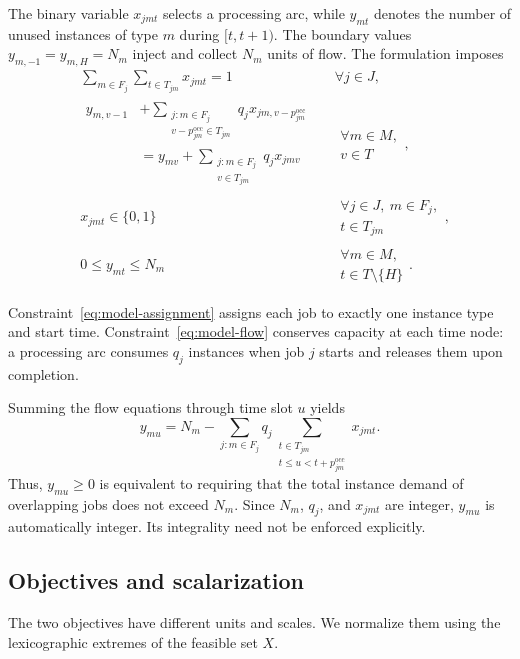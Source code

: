 \documentclass[conference]{IEEEtran}
\begin{document}
The binary variable $x_{jmt}$ selects a processing arc, while
$y_{mt}$ denotes the number of unused instances of type $m$
during $[t,t+1)$. The boundary values
$y_{m,-1}=y_{m,H}=N_m$ inject and collect $N_m$ units of
flow. The formulation imposes
\begin{align}
&\sum_{m\in F_j}\sum_{t\in T_{jm}}x_{jmt}=1
&&\forall j\in J,
\label{eq:model-assignment}\\
&\begin{aligned}
y_{m,v-1}
&+\sum_{\substack{j:m\in F_j\\
v-p_{jm}^{\mathrm{occ}}\in T_{jm}}}
q_j x_{jm,v-p_{jm}^{\mathrm{occ}}}\\
&=y_{mv}
+\sum_{\substack{j:m\in F_j\\v\in T_{jm}}}
q_j x_{jmv}
\end{aligned}
&&\substack{\forall m\in M,\\v\in T},
\label{eq:model-flow}\\
&x_{jmt}\in\{0,1\}
&&\substack{\forall j\in J,\ m\in F_j,\\
t\in T_{jm}},\\
&0\leq y_{mt}\leq N_m
&&\substack{\forall m\in M,\\
t\in T\setminus\{H\}}.
\end{align}

Constraint~\eqref{eq:model-assignment} assigns each job to
exactly one instance type and start time.
Constraint~\eqref{eq:model-flow} conserves capacity at each
time node: a processing arc consumes $q_j$ instances when
job $j$ starts and releases them upon completion.

Summing the flow equations through time slot $u$ yields
\begin{equation}
\label{eq:idle-capacity}
y_{mu}
=N_m-
\sum_{j:m\in F_j}q_j
\sum_{\substack{t\in T_{jm}\\
t\leq u<t+p_{jm}^{\mathrm{occ}}}}
x_{jmt}.
\end{equation}
Thus, $y_{mu}\geq0$ is equivalent to requiring that the
total instance demand of overlapping jobs does not
exceed $N_m$. Since $N_m$, $q_j$, and $x_{jmt}$ are
integer, $y_{mu}$ is automatically integer.
Its integrality need not be enforced explicitly.


\subsection{Objectives and scalarization}

The two objectives have different units and scales.
We normalize them using the lexicographic extremes of
the feasible set $X$.
\end{document}
